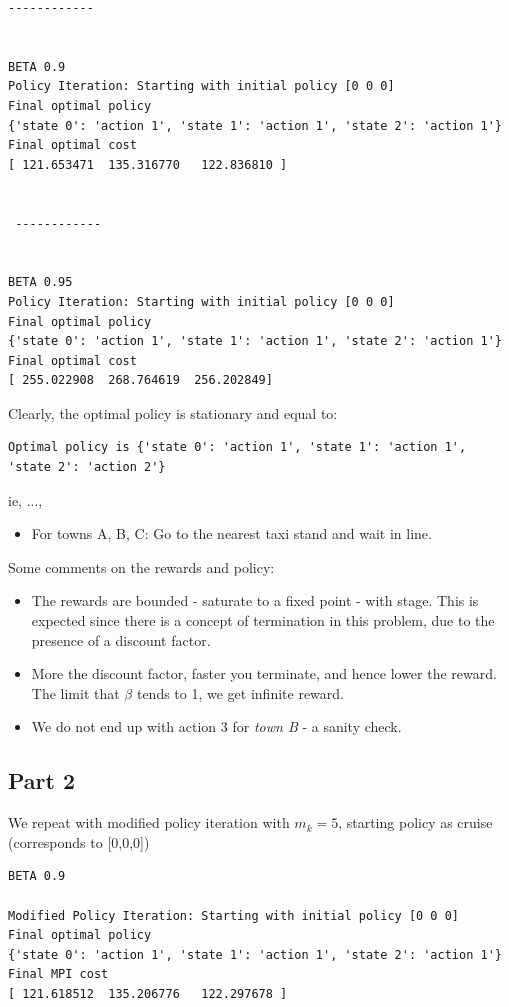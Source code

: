 \begin{lstlisting}[numbers = none]
 ------------ 


BETA 0.9
Policy Iteration: Starting with initial policy [0 0 0]
Final optimal policy
{'state 0': 'action 1', 'state 1': 'action 1', 'state 2': 'action 1'}
Final optimal cost
[ 121.653471  135.316770   122.836810 ]


 ------------ 


BETA 0.95
Policy Iteration: Starting with initial policy [0 0 0]
Final optimal policy
{'state 0': 'action 1', 'state 1': 'action 1', 'state 2': 'action 1'}
Final optimal cost
[ 255.022908  268.764619  256.202849]

\end{lstlisting}

Clearly, the optimal policy is stationary and equal to:
\begin{lstlisting}[numbers = none]
Optimal policy is {'state 0': 'action 1', 'state 1': 'action 1', 'state 2': 'action 2'}
\end{lstlisting}

ie, ...,

\begin{itemize}
\item For towns A, B, C:  Go to the nearest taxi stand and wait in line.
\end{itemize}

Some comments on the rewards and policy:
\begin{itemize}
\item The rewards are bounded - saturate to a fixed point - with stage. This is expected since there is a concept of termination in this problem, due to the presence of a discount factor.
\item More the discount factor, faster you terminate, and hence lower the reward. The limit that $\beta$ tends to 1, we get infinite reward.
\item We do not end up with action 3 for \textit{town B} - a sanity check.
\end{itemize}

\subsection{Part 2}

We repeat with modified policy iteration with $m_k = 5 $, starting policy as cruise (corresponds to [0,0,0])

\begin{lstlisting}
BETA 0.9

Modified Policy Iteration: Starting with initial policy [0 0 0]
Final optimal policy
{'state 0': 'action 1', 'state 1': 'action 1', 'state 2': 'action 1'}
Final MPI cost
[ 121.618512  135.206776   122.297678 ]
\end{lstlisting}


